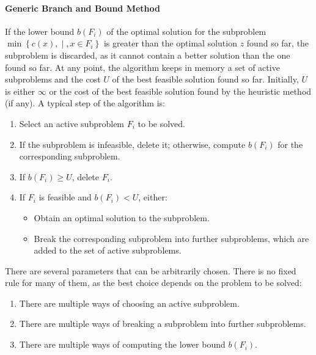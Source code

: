 \paragraph*{Generic Branch and Bound Method}
If the lower bound $b(F_i)$ of the optimal solution for the subproblem $\min\left\{ c(x), \middle\vert, x \in F_i \right\}$ is greater than the optimal solution $z$ found so far, the subproblem is discarded, as it cannot contain a better solution than the one found so far.
At any point, the algorithm keeps in memory a set of active subproblems and the cost $U$ of the best feasible solution found so far.
Initially, $U$ is either $\infty$ or the cost of the best feasible solution found by the heuristic method (if any).
A typical step of the algorithm is:
\begin{enumerate}
    \item Select an active subproblem $F_i$ to be solved. 
    \item If the subproblem is infeasible, delete it; otherwise, compute $b(F_i)$ for the corresponding subproblem.
    \item If $b(F_i) \geq U$, delete $F_i$.
    \item If $F_i$ is feasible and $b(F_i) < U$, either:
        \begin{itemize}
            \item Obtain an optimal solution to the subproblem.
            \item Break the corresponding subproblem into further subproblems, which are added to the set of active subproblems.
        \end{itemize}
\end{enumerate}
There are several parameters that can be arbitrarily chosen. 
There is no fixed rule for many of them, as the best choice depends on the problem to be solved:
\begin{enumerate}
    \item There are multiple ways of choosing an active subproblem.
    \item There are multiple ways of breaking a subproblem into further subproblems.
    \item There are multiple ways of computing the lower bound $b(F_i)$.
\end{enumerate}

